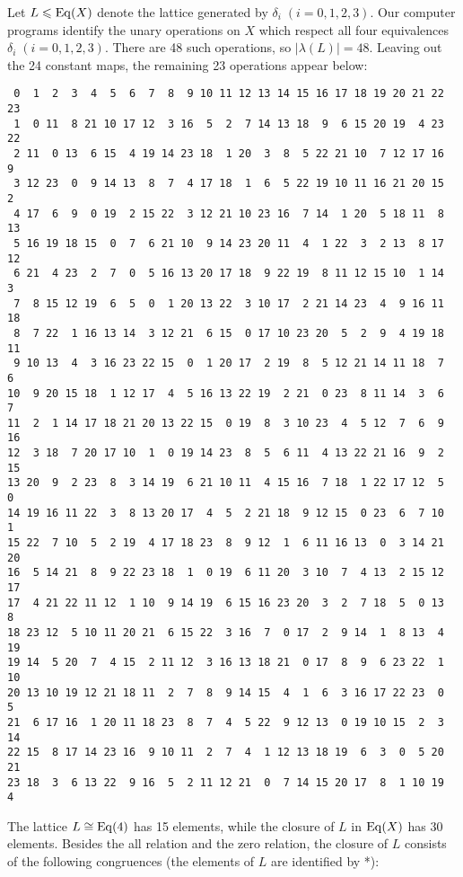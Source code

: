 \newpage
Let $L\leqslant \operatorname{Eq}(X)$ denote the lattice generated by $\delta_i\;(i=0,1,2,3)$. 
Our computer programs identify the unary operations on $X$ which respect all four 
equivalences $\delta_i\;(i=0,1,2,3)$.  There are 48 such operations, 
so $|\lambda(L)| = 48$.  Leaving out the 24 constant maps, the
remaining 23 operations appear below:
\begin{verbatim}
 0  1  2  3  4  5  6  7  8  9 10 11 12 13 14 15 16 17 18 19 20 21 22 23
 1  0 11  8 21 10 17 12  3 16  5  2  7 14 13 18  9  6 15 20 19  4 23 22
 2 11  0 13  6 15  4 19 14 23 18  1 20  3  8  5 22 21 10  7 12 17 16  9
 3 12 23  0  9 14 13  8  7  4 17 18  1  6  5 22 19 10 11 16 21 20 15  2
 4 17  6  9  0 19  2 15 22  3 12 21 10 23 16  7 14  1 20  5 18 11  8 13
 5 16 19 18 15  0  7  6 21 10  9 14 23 20 11  4  1 22  3  2 13  8 17 12
 6 21  4 23  2  7  0  5 16 13 20 17 18  9 22 19  8 11 12 15 10  1 14  3
 7  8 15 12 19  6  5  0  1 20 13 22  3 10 17  2 21 14 23  4  9 16 11 18
 8  7 22  1 16 13 14  3 12 21  6 15  0 17 10 23 20  5  2  9  4 19 18 11
 9 10 13  4  3 16 23 22 15  0  1 20 17  2 19  8  5 12 21 14 11 18  7  6
10  9 20 15 18  1 12 17  4  5 16 13 22 19  2 21  0 23  8 11 14  3  6  7
11  2  1 14 17 18 21 20 13 22 15  0 19  8  3 10 23  4  5 12  7  6  9 16
12  3 18  7 20 17 10  1  0 19 14 23  8  5  6 11  4 13 22 21 16  9  2 15
13 20  9  2 23  8  3 14 19  6 21 10 11  4 15 16  7 18  1 22 17 12  5  0
14 19 16 11 22  3  8 13 20 17  4  5  2 21 18  9 12 15  0 23  6  7 10  1
15 22  7 10  5  2 19  4 17 18 23  8  9 12  1  6 11 16 13  0  3 14 21 20
16  5 14 21  8  9 22 23 18  1  0 19  6 11 20  3 10  7  4 13  2 15 12 17
17  4 21 22 11 12  1 10  9 14 19  6 15 16 23 20  3  2  7 18  5  0 13  8
18 23 12  5 10 11 20 21  6 15 22  3 16  7  0 17  2  9 14  1  8 13  4 19
19 14  5 20  7  4 15  2 11 12  3 16 13 18 21  0 17  8  9  6 23 22  1 10
20 13 10 19 12 21 18 11  2  7  8  9 14 15  4  1  6  3 16 17 22 23  0  5
21  6 17 16  1 20 11 18 23  8  7  4  5 22  9 12 13  0 19 10 15  2  3 14
22 15  8 17 14 23 16  9 10 11  2  7  4  1 12 13 18 19  6  3  0  5 20 21
23 18  3  6 13 22  9 16  5  2 11 12 21  0  7 14 15 20 17  8  1 10 19  4
\end{verbatim}
\newpage
The lattice $L\cong \operatorname{Eq}(4)$ has 15 elements, while the closure of $L$ in $\operatorname{Eq}(X)$ has
30 elements.  Besides the all relation and the zero relation, the closure of $L$
consists of the following congruences (the elements of $L$ are identified by *):

